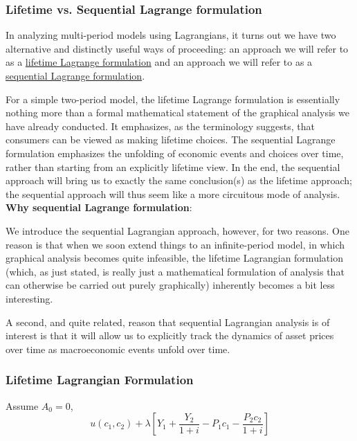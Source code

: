 \documentclass[10pt]{article}
\begin{document}
\subsubsection{Lifetime vs. Sequential Lagrange formulation}

In analyzing multi-period models using Lagrangians, it turns out we have two alternative and distinctly useful ways of proceeding: an approach we will refer to as a 
{\underline {lifetime Lagrange formulation}} and an approach we will refer to as a 
{\underline {sequential Lagrange formulation}}.

For a simple two-period model, the lifetime Lagrange formulation is essentially nothing more than a formal mathematical statement of the graphical analysis we have already conducted. It emphasizes, as the terminology suggests, that consumers can be viewed as making lifetime choices. The sequential Lagrange formulation emphasizes the unfolding of economic events and choices over time, rather than starting from an explicitly lifetime view. In the end, the sequential approach will bring us to exactly the same conclusion(s) as the lifetime approach; the sequential approach will thus seem like a more circuitous mode of analysis.\\

{\textbf {Why sequential Lagrange formulation}}:

We introduce the sequential Lagrangian approach, however, for two reasons. One reason is that when we soon extend things to an infinite-period model, in which graphical analysis becomes quite infeasible, the lifetime Lagrangian formulation (which, as just stated, is really just a mathematical formulation of analysis that can otherwise be carried out purely graphically) inherently becomes a bit less interesting. 

A second, and quite related, reason that sequential Lagrangian analysis is of interest is that it will allow us to explicitly track the dynamics of asset prices over time as macroeconomic events unfold over time.

\subsubsection{Lifetime Lagrangian Formulation}

Assume $ A_0 = 0 $,
\begin{equation}
u(c_1,c_2) + \lambda \left[ 
		Y_1 + \frac{Y_2}{1 + i} - P_1c_1 - \frac{P_2c_2}{1 + i}
\right] 
\end{equation}
\noindent{}\\
\end{document}
